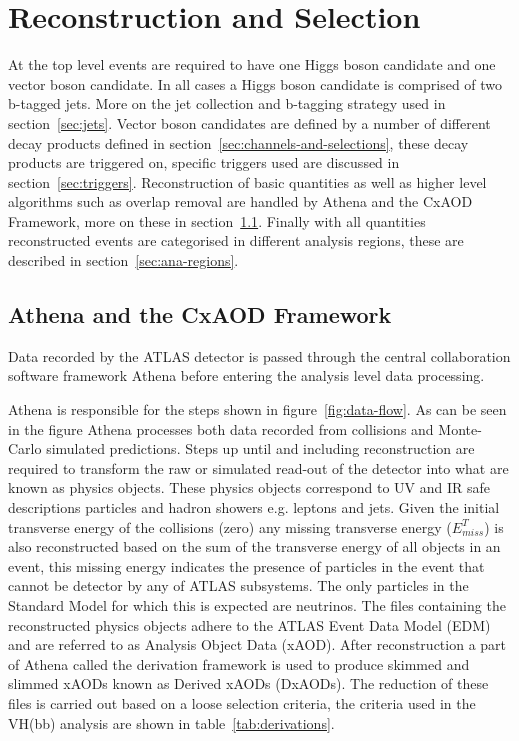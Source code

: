 \chapter{Reconstruction and Selection}%
\label{sec:recon}

At the top level events are required to have one Higgs boson candidate and one
vector boson candidate. In all cases a Higgs boson candidate is comprised of two
b-tagged jets. More on the jet collection and b-tagging strategy used in
section~\ref{sec:jets}. Vector boson candidates are defined by a number of
different decay products defined in section~\ref{sec:channels-and-selections},
these decay products are triggered on, specific triggers used are discussed in
section~\ref{sec:triggers}. Reconstruction of basic quantities as well as higher
level algorithms such as overlap removal are handled by Athena and the CxAOD
Framework, more on these in section~\ref{sec:cxaod}. Finally with all quantities
reconstructed events are categorised in different analysis regions, these are
described in section~\ref{sec:ana-regions}.

\section{Athena and the CxAOD Framework}
\label{sec:cxaod}
Data recorded by the ATLAS detector is passed through the central collaboration
software framework Athena before entering the analysis level data processing.

Athena is responsible for the steps shown in figure~\ref{fig:data-flow}. As can
be seen in the figure Athena processes both data recorded from collisions and
Monte-Carlo simulated predictions. Steps up until and including reconstruction
are required to transform the raw or simulated read-out of the detector into
what are known as physics objects. These physics objects correspond to UV and IR
safe descriptions particles and hadron showers e.g. leptons and jets. Given the
initial transverse energy of the collisions (zero) any missing transverse energy
($E^T_{miss}$) is also reconstructed based on the sum of the transverse energy
of all objects in an event, this missing energy indicates the presence of
particles in the event that cannot be detector by any of ATLAS subsystems. The
only particles in the Standard Model for which this is expected are neutrinos.
The files containing the reconstructed physics objects adhere to the ATLAS Event
Data Model (EDM) and are referred to as Analysis Object Data (xAOD). After
reconstruction a part of Athena called the derivation framework is used to
produce skimmed and slimmed xAODs known as Derived xAODs (DxAODs). The reduction
of these files is carried out based on a loose selection criteria, the criteria
used in the VH(bb) analysis are shown in table~\ref{tab:derivations}.


